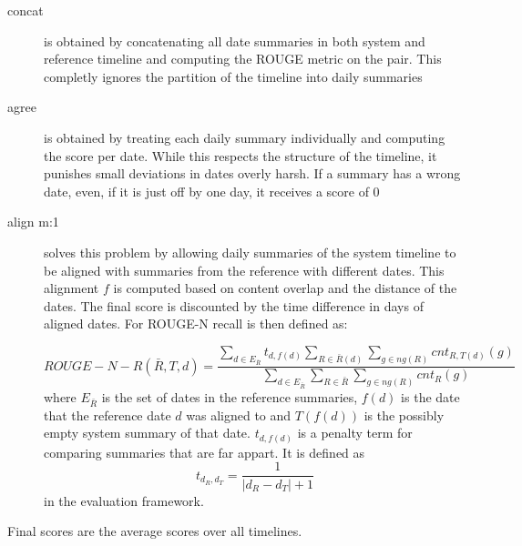 \documentclass[a4paper,BCOR=10mm]{report}
\numberwithin{lemma}{chapter}
\numberwithin{definition}{chapter}
\begin{document}
\begin{description}
\item[concat] {is obtained by concatenating all date summaries in both system and reference timeline and computing the ROUGE metric on the pair.
This completly ignores the partition of the timeline into daily summaries}
\item[agree] {is obtained by treating each daily summary individually and computing the score per date. While this respects the structure of the timeline, it punishes small deviations in dates overly harsh. If a summary has a wrong date, even, if it is just off by one day, it receives a score of $0$}
\item[align m:1] {solves this problem by allowing daily summaries of the system timeline to be aligned with summaries from the reference with different dates. This alignment $f$ is computed based on content overlap and the distance of the dates.
The final score is discounted by the time difference in days of aligned dates. For ROUGE-N recall is then defined as:

\begin{equation}
    \mathit{ROUGE-N-R}(\bar{R}, T, d) =  \frac{
        \sum_{d \in E_{\bar{R}}} t_{d, f(d)}
        \sum_{R \in \bar{R}(d)}
        \sum_{g \in \mathit{ng}(R)}
        \mathit{cnt}_{R,T(d)}(g)
    }{
        \sum_{d \in E_{\bar{R}}}
        \sum_{R \in \bar{R}}
        \sum_{g \in \mathit{ng}(R)}
        \mathit{cnt}_R(g)
    }
\end{equation}
where $E_{\bar{R}}$ is the set of dates in the reference summaries,
$f(d)$ is the date that the reference date $d$ was aligned to and $T(f(d))$ is the possibly empty system summary of that date.
$t_{d,f(d)}$ is a penalty term for comparing summaries that are far appart.
It is defined as
\begin{equation}
t_{d_R, d_T} = \frac{1}{|d_R - d_T| + 1}
\end{equation}
in the evaluation framework.


 }
\end{description}


Final scores are the average scores over all timelines.
\end{document}
